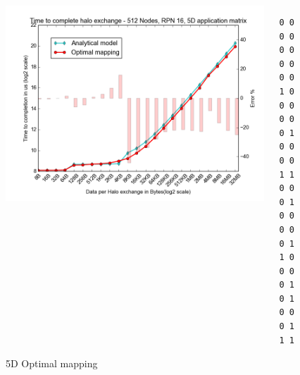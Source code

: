 \documentclass{beamer}
\begin{document}
\begin{frame}[fragile]
\begin{figure}
\caption{5D Optimal mapping}
\begin{columns}
  \begin{column}{0.6\textwidth}
    \includegraphics[width=1\textwidth]{../mappings/5d_optimal_model.png}
  \end{column}
  \begin{column}{0.3\textwidth}
\lstset{title=Mapping sample}
\begin{lstlisting}[basicstyle=\footnotesize\ttfamily, frame=lines,columns=fixed]
0 0 0 0 0 0
0 0 0 0 1 0
0 0 0 0 0 1
0 0 0 0 1 1
0 0 0 1 0 0
0 0 0 1 1 0
0 0 0 1 0 1
0 0 0 1 1 1
\end{lstlisting}
  \end{column}
\end{columns}
\end{figure}
\end{frame}
\end{document}
